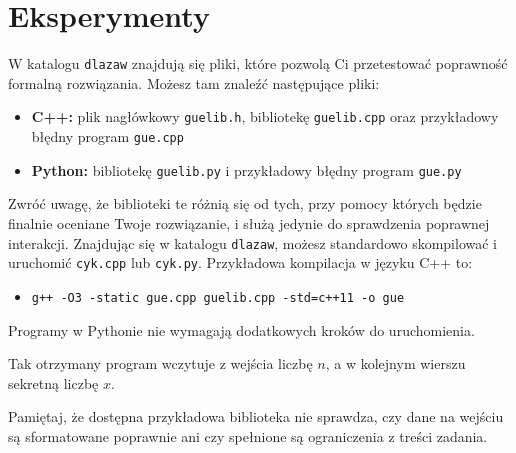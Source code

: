 \documentclass{spiral}
\begin{document}
\section{Eksperymenty}
    W katalogu \texttt{dlazaw} znajdują się pliki,
    które pozwolą Ci przetestować poprawność formalną rozwiązania.
    Możesz tam znaleźć następujące pliki:
    \begin{itemize}
        \item \textbf{C++:} plik nagłówkowy \texttt{guelib.h},
            bibliotekę \texttt{guelib.cpp}
            oraz przykładowy błędny program \texttt{gue.cpp}
        \item \textbf{Python:} bibliotekę \texttt{guelib.py}
            i przykładowy błędny program \texttt{gue.py}
    \end{itemize}

    Zwróć uwagę, że biblioteki te różnią się od tych,
    przy pomocy których będzie finalnie oceniane Twoje
    rozwiązanie, i służą jedynie do sprawdzenia poprawnej interakcji.
    Znajdując się w katalogu \texttt{dlazaw}, możesz
    standardowo skompilować i uruchomić \texttt{cyk.cpp} lub \texttt{cyk.py}.
    Przykładowa kompilacja w języku C++ to:

    \begin{itemize}
        \item \texttt{g++ -O3 -static gue.cpp guelib.cpp -std=c++11 -o gue}
    \end{itemize}

    Programy w Pythonie nie wymagają dodatkowych kroków do uruchomienia.

    Tak otrzymany program wczytuje z wejścia liczbę $n$,
    a w kolejnym wierszu sekretną liczbę $x$.

    Pamiętaj, że dostępna przykładowa biblioteka nie sprawdza,
    czy dane na wejściu są sformatowane poprawnie
    ani czy spełnione są ograniczenia z treści zadania.
\end{document}
